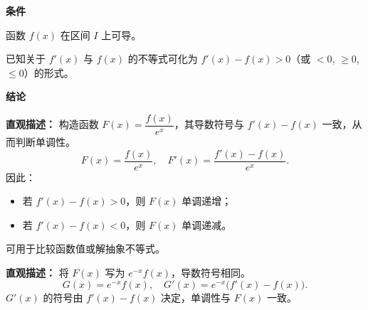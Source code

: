 \begin{statementbox}
	\textbf{\textcolor{CStatement}{条件}}
	\begin{description}[style=nextline, leftmargin=2.8em, labelsep=0.5em, itemsep=0.35em]
		\item[\textbf{\textcolor{CStatement}{条件1（函数可导）：}}] 函数 $f(x)$ 在区间 $I$ 上可导。
		\item[\textbf{\textcolor{CStatement}{条件2（不等式可化）：}}] 已知关于 $f'(x)$ 与 $f(x)$ 的不等式可化为 $f'(x)-f(x) > 0$（或 $<0$, $\geq 0$, $\leq 0$）的形式。
	\end{description}
	\medskip
	\textbf{\textcolor{CStatement}{结论}}
	\begin{description}[style=nextline, leftmargin=2.8em, labelsep=0.5em, itemsep=0.45em]
		\item[\textbf{\textcolor{CStatement}{结论一（构造单调性）：}}]
			\textbf{\textcolor{CStatement}{直观描述：}}
			构造函数 $F(x)=\dfrac{f(x)}{e^x}$，其导数符号与 $f'(x)-f(x)$ 一致，从而判断单调性。
			\[
				F(x)=\frac{f(x)}{e^x},\quad F'(x)=\frac{f'(x)-f(x)}{e^x}.
			\]
			因此：
			\begin{itemize}
			\item 若 $f'(x)-f(x)>0$，则 $F(x)$ 单调递增；
			\item 若 $f'(x)-f(x)<0$，则 $F(x)$ 单调递减。
		\end{itemize}
			可用于比较函数值或解抽象不等式。

		\item[\textbf{\textcolor{CStatement}{常见变形（等价形式）：}}]
			\textbf{\textcolor{CStatement}{直观描述：}}
			将 $F(x)$ 写为 $e^{-x}f(x)$，导数符号相同。
			\[
				G(x)=e^{-x}f(x),\quad G'(x)=e^{-x}\bigl(f'(x)-f(x)\bigr).
			\]
			$G'(x)$ 的符号由 $f'(x)-f(x)$ 决定，单调性与 $F(x)$ 一致。
	\end{description}
\end{statementbox}
